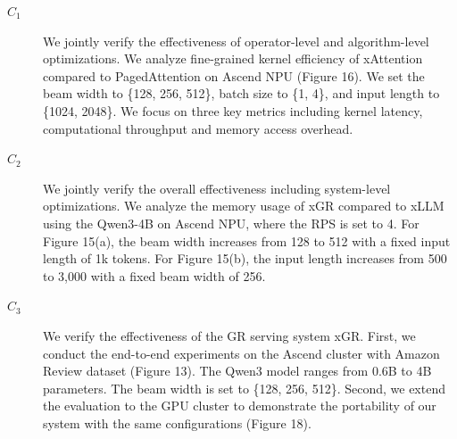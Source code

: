 \documentclass[conference]{IEEEtran}
\begin{document}
\artrel

\begin{description}

\item[$C_1$] We jointly verify the effectiveness of operator-level and algorithm-level optimizations. We analyze fine-grained kernel efficiency of xAttention compared to PagedAttention on Ascend NPU (Figure 16). We set the beam width to \{128, 256, 512\}, batch size to \{1, 4\}, and input length to \{1024, 2048\}. We focus on three key metrics including kernel latency, computational throughput and memory access overhead.

\item[$C_2$]  We jointly verify the overall effectiveness including system-level optimizations. We analyze the memory usage of xGR compared to xLLM using the Qwen3-4B on Ascend NPU, where the RPS is set to 4. For Figure 15(a), the beam width increases from 128 to 512 with a fixed input length of 1k tokens. For Figure 15(b), the input length increases from 500 to 3,000 with a fixed beam width of 256.


\item[$C_3$] We verify the effectiveness of the GR serving system xGR. First, we conduct the end-to-end experiments on the Ascend cluster with Amazon Review dataset (Figure 13). The Qwen3 model ranges from 0.6B to 4B parameters. The beam width is set to \{128, 256, 512\}. Second, we extend the evaluation to the GPU cluster to demonstrate the portability of our system with the same configurations (Figure 18).

\end{description}



\artexp
\end{document}
